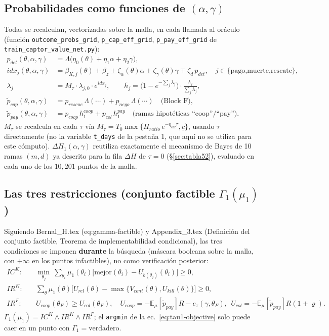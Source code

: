 \documentclass[ecta,nameyear,draft]{econsocart}
\newcommand{\pyfile}[1]{\texttt{#1}}
\newcommand{\pyvar}[1]{\texttt{#1}}
\begin{document}
\subsection{Probabilidades como funciones de $(\alpha,\gamma)$}

Todas se recalculan, vectorizadas sobre la malla, en cada llamada al oráculo (función
\pyvar{outcome\_probs\_grid}, \pyvar{p\_cap\_eff\_grid}, \pyvar{p\_pay\_eff\_grid} de
\pyfile{train\_captor\_value\_net.py}):
\begin{align}
p_{det}(\theta,\alpha,\gamma) &= \Lambda\bigl(\eta_0(\theta)+\eta_1\alpha+\eta_2\gamma\bigr), \\
idx_j(\theta,\alpha,\gamma) &= \beta_{K,j}(\theta)+\beta_z\pm\zeta_\alpha(\theta)\alpha\pm\zeta_\gamma(\theta)\gamma\mp\zeta_d\,p_{det}, \quad j\in\{\text{pago,muerte,rescate}\}, \\
\lambda_j &= M_\tau\cdot\lambda_{j,0}\cdot e^{idx_j}, \qquad \bar h_j = \bigl(1-e^{-\sum_j\lambda_j}\bigr)\cdot\frac{\lambda_j}{\sum_j\lambda_j}, \\
\tilde p_{cap}(\theta,\alpha,\gamma) &= p_{rescue}\,\Lambda(\cdots)+p_{nego}\,\Lambda(\cdots) \quad\text{(Block F)}, \\
\tilde p_{pay}(\theta,\alpha,\gamma) &= p_{coop}\,h_1^{coop}+p_{col}\,h_1^{pay} \quad\text{(ramas hipotéticas ``coop''/``pay'')}.
\end{align}
$M_\tau$ se recalcula en cada $\tau$ vía $M_\tau=T_0\max\{H_{ratio}\,e^{-\eta_{cal}\tau},\underline c\}$,
usando $\tau$ directamente (no la variable \pyvar{t\_days} de la pestaña 1, que aquí no se
utiliza para este cómputo). $\Delta H_1(\alpha,\gamma)$ reutiliza exactamente el mecanismo de
Bayes de 10 ramas $(m,d)$ ya descrito para la fila $\Delta H$ de $\tau=0$
(\S\ref{sec:tabla52}), evaluado en cada uno de los $10{,}201$ puntos de la malla.

\subsection{Las tres restricciones (conjunto factible $\Gamma_1(\mu_1)$)}

Siguiendo Bernal\_H.tex (eq:gamma-factible) y Appendix\_3.tex (Definición del conjunto
factible, Teorema de implementabilidad condicional), las tres condiciones se imponen
\textbf{durante} la búsqueda (máscara booleana sobre la malla, con $+\infty$ en los puntos
infactibles), no como verificación posterior:
\begin{align}
IC^K:&\quad \min_{\theta_j}\ \sum_{\theta_i}\mu_1(\theta_i)\bigl[\text{mejor}(\theta_i)-U_{b(\theta_j)}(\theta_i)\bigr] \ge 0, \\
IR^K:&\quad \sum_\theta\mu_1(\theta)\bigl[U_{rel}(\theta)-\max\{V_{cont}(\theta),U_{kill}(\theta)\}\bigr]\ge 0, \\
IR^F:&\quad U_{coop}(\theta_F)\ge U_{col}(\theta_F), \quad U_{coop}=-\mathbb{E}_\mu[\tilde p_{pay}]R-e_\tau(\gamma,\theta_F),\ \ U_{col}=-\mathbb{E}_\mu[\tilde p_{pay}]R(1+\varrho).
\end{align}
$\Gamma_1(\mu_1) = IC^K \wedge IR^K \wedge IR^F$; el \pyvar{argmin} de la ec.~\eqref{eq:tau1-objective}
solo puede caer en un punto con $\Gamma_1=\text{verdadero}$.
\end{document}
